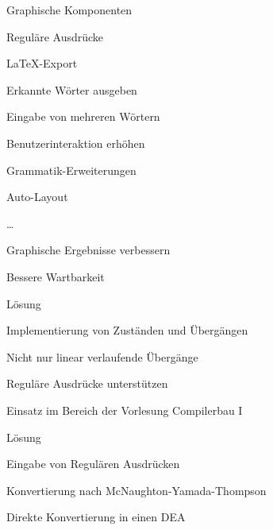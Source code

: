 



{
    \begin{itemgroup}{}
	\item Graphische Komponenten
	\item Reguläre Ausdrücke
	\item \LaTeX-Export
	\item Erkannte Wörter ausgeben
	\item Eingabe von mehreren Wörtern
	\item Benutzerinteraktion erhöhen
	\item Grammatik-Erweiterungen
	\item Auto-Layout
	\item \ldots
	\end{itemgroup}

    \vfill{}
}


{
    \begin{itemgroup}{}
	\item Graphische Ergebnisse verbessern
	\item Bessere Wartbarkeit
    \end{itemgroup}

    \begin{itemgroup}{Lösung}
	\item Implementierung von Zuständen und Übergängen
	\item Nicht nur linear verlaufende Übergänge
	\end{itemgroup}
    
    \vfill{}
}


{
    \begin{itemgroup}{}
	\item Reguläre Ausdrücke unterstützen
	\item Einsatz im Bereich der Vorlesung Compilerbau I
    \end{itemgroup}

    \begin{itemgroup}{Lösung}
	\item Eingabe von Regulären Ausdrücken
	\item Konvertierung nach McNaughton-Yamada-Thompson
	\item Direkte Konvertierung in einen DEA
	\end{itemgroup}
    
    \vfill{}
}


